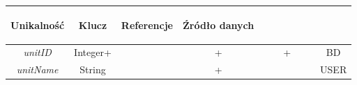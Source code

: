 \documentclass[12pt,twoside]{report}
\begin{document}
\begin{enumerate}[start=10,label={\bfseries REL\textbackslash\arabic*}]
\begin{table}[H]
\begin{tabular}{|c|c|c|c|c|c|c|c|c|c|}
			\begin{sideways}Unikalność \end{sideways}& 
			\begin{sideways}Klucz \end{sideways}& 
			\begin{sideways}Referencje \end{sideways}&
			\begin{sideways}Źródło danych\end{sideways}\\
			\hline
			\textit{unitID}&Integer+&&+&&&+&&&BD\\	
			\hline
			\textit{unitName}&String&&+&&&&&&USER\\	
			\hline
		\end{tabular}
	\end{table}
	

\end{enumerate}
\end{document}
